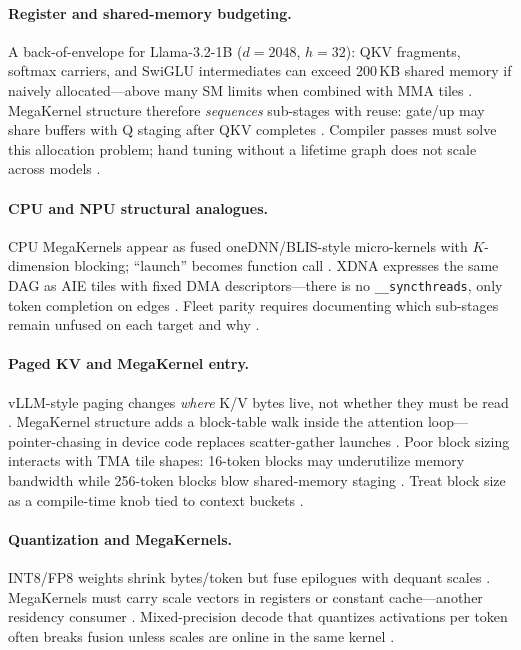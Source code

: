 \paragraph{Register and shared-memory budgeting.} A back-of-envelope for Llama-3.2-1B ($d{=}2048$, $h{=}32$): QKV fragments, softmax carriers, and SwiGLU intermediates can exceed 200\,KB shared memory if naively allocated---above many SM limits when combined with MMA tiles \citep{nvidia2022hopper}. MegaKernel structure therefore \emph{sequences} sub-stages with reuse: gate/up may share buffers with Q staging after QKV completes \citep{chen2020compilerbasedhardw,taxbreak2026}. Compiler passes must solve this allocation problem; hand tuning without a lifetime graph does not scale across models \citep{yirage2026,liu2024deepseekv3}.

\paragraph{CPU and NPU structural analogues.} CPU MegaKernels appear as fused oneDNN/BLIS-style micro-kernels with $K$-dimension blocking; ``launch'' becomes function call \citep{dlbook}. XDNA expresses the same DAG as AIE tiles with fixed DMA descriptors---there is no \texttt{\_\_syncthreads}, only token completion on edges \citep{amd2024aie,amd2024xdna}. Fleet parity requires documenting which sub-stages remain unfused on each target and why \citep{patel2025llminference,chen2020compilerbasedhardw}.

\paragraph{Paged KV and MegaKernel entry.} vLLM-style paging changes \emph{where} K/V bytes live, not whether they must be read \citep{kwon2023vllm}. MegaKernel structure adds a block-table walk inside the attention loop---pointer-chasing in device code replaces scatter-gather launches \citep{patel2025llminference,memoryfloor2026}. Poor block sizing interacts with TMA tile shapes: 16-token blocks may underutilize memory bandwidth while 256-token blocks blow shared-memory staging \citep{semianalysis2024tma,dao2023flashdecoding}. Treat block size as a compile-time knob tied to context buckets \citep{yirage2026,kwon2023vllm}.

\paragraph{Quantization and MegaKernels.} INT8/FP8 weights shrink bytes/token but fuse epilogues with dequant scales \citep{nvidia2022hopper,patel2025llminference}. MegaKernels must carry scale vectors in registers or constant cache---another residency consumer \citep{semianalysis2024tma,chen2020compilerbasedhardw}. Mixed-precision decode that quantizes activations per token often breaks fusion unless scales are online in the same kernel \citep{liu2024deepseekv3,memoryfloor2026}.

